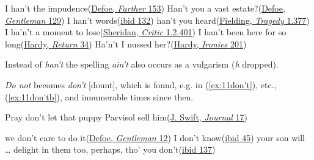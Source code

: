\ea \label{ex:11han't2}
\ea I han't the impudence\hfill(\href{https://archive.org/details/fartheradventure00defo/page/152/mode/2up?q=%22I+han%27t%22&view=theater}{Defoe, \textit{Farther} 153}) %
\ex Han't you a vast estate?\hfill(\href{https://books.google.co.jp/books?id=WopaAAAAMAAJ&printsec=frontcover&hl=ja&source=gbs_ge_summary_r&cad=0#v=onepage&q=vast%20estate&f=false}{Defoe, \textit{Gentleman} 129}) 
\ex I han't words\hfill(\href{https://ia800900.us.archive.org/29/items/compleatenglishg00deforich/compleatenglishg00deforich.pdf}{ibid 132}) %
\ex han't you heard\hfill(\href{https://archive.org/details/bim_eighteenth-century_the-tragedy-of-tragedies_fielding-henry_1765/page/22/mode/2up?q=%22han%27t+you+heard%22&view=theater}{Fielding, \textit{Tragedy} 1.377})
\ex I ha'n't a moment to lose\hfill(\href{https://archive.org/details/criticoratraged00aitkgoog/page/n70/mode/2up?q=%22moment+to+lose%22&view=theater}{Sheridan, \textit{Critic} 1.2.401})
\ex I han't been here for so long\hfill(\href{https://archive.org/details/returnofthenativ00harduoft/page/26/mode/2up?q=%22I+han%27t+been%22&view=theater}{Hardy, \textit{Return} 34}) %
\ex Ha'n't I nussed her?\hfill(\href{https://archive.org/details/lifeslittleironi00harduoft/page/172/mode/2up?q=%22nussed+her%22&view=theater}{Hardy, \textit{Ironies} 201}) %
\z
\z

Instead of \textit{han't} the spelling \textit{ain't} also occurs as a vulgarism (\textit{h} dropped).


\textit{Do not} becomes \textit{don't} [dount], which is found, e.g. in (\ref{ex:11don't}), etc., (\ref{ex:11don'tb}), and innumerable times since then.

\ea \label{ex:11don't} Pray don't let that puppy Parvisol sell him\hfill(\href{https://archive.org/details/journaltostellae00swifuoft/page/16/mode/2up?q=%22don%27t%22&view=theater}{J. Swift, \textit{Journal} 17}) %
\z

\ea \label{ex:11don'tb}
\ea we don't care to do it\hfill(\href{https://ia800900.us.archive.org/29/items/compleatenglishg00deforich/compleatenglishg00deforich.pdf}{Defoe, \textit{Gentleman} 12}) %
\ex I don't know\hfill(\href{https://books.google.co.jp/books?hl=ja&id=WopaAAAAMAAJ&q=12#v=onepage&q=%22we%20don't%20care%20to%20do%22&f=false}{ibid 45}) %
\ex your son will {\dots} delight in them too, perhaps, tho' you don't\hfill(\href{https://books.google.co.jp/books?hl=ja&id=WopaAAAAMAAJ&q=137#v=onepage&q=%22delight%20in%20them%22&f=false}{ibid 137}) %
\z
\z
{}


